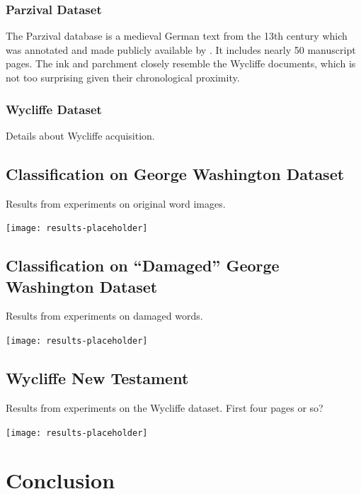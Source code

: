 \documentclass[final]{ukthesis}
\begin{document}
\subsection{Parzival Dataset}
The Parzival database is a medieval German text from the 13th century which was annotated and made publicly available by \cite{fischer2010ground}. It includes nearly 50 manuscript pages. The ink and parchment closely resemble the Wycliffe documents, which is not too surprising given their chronological proximity.

\subsection{Wycliffe Dataset}
Details about Wycliffe acquisition.

%
%
\section{Classification on George Washington Dataset}
Results from experiments on original word images.

\begin{center}
\texttt{[image: results-placeholder]}
\end{center}



%
%
\section{Classification on ``Damaged'' George Washington Dataset}
Results from experiments on damaged words.

\begin{center}
\texttt{[image: results-placeholder]}
\end{center}


%
%
\section{Wycliffe New Testament}
Results from experiments on the Wycliffe dataset. First four pages or so?

\begin{center}
\texttt{[image: results-placeholder]}
\end{center}





%
%
%
\chapter{Conclusion}
\end{document}
